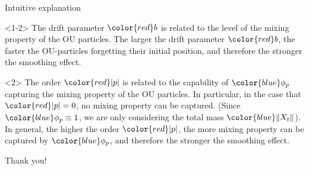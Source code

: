 \documentclass[xcolor=dvipsnames]{beamer}
\begin{document}
\begin{frame}{Intuitive explanation}
\begin{block}{}<1-2>
	The drift parameter $\color{red}b$ is related to the level of the mixing property of the OU particles.
		The larger the drift parameter $\color{red}b$, the faster the OU-particles forgetting their initial position, and therefore the stronger the smoothing effect.
\end{block}
\begin{block}{}<2>
		The order ${\color{red}|p|}$ is related to the capability of $\color{blue}\phi_p$ capturing the mixing property of the OU particles.
		In particular, in the case that $\color{red}|p| = 0$, no mixing property can be captured. (Since $\color{blue}\phi_p \equiv 1$, we are only considering the total mass $\color{blue}\|X_t\|$).
		In general, the higher the order ${\color{red}|p|}$, the more mixing property can be captured by $\color{blue}\phi_p$, and therefore the stronger the smoothing effect.
\end{block}
\end{frame}


\begin{frame}
\begin{center}
\Huge{Thank you!}
\end{center}
\begin{center}
\end{center}
\end{frame}
\end{document}
